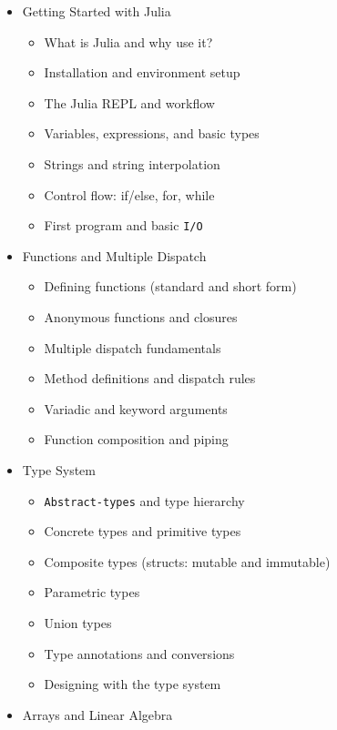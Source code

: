 \documentclass[
]{article}
\providecommand{\tightlist}{%
  \setlength{\itemsep}{0pt}\setlength{\parskip}{0pt}}
\begin{document}
\begin{itemize}
\tightlist
\item
  Getting Started with Julia

  \begin{itemize}
  \tightlist
  \item
    What is Julia and why use it?
  \item
    Installation and environment setup
  \item
    The Julia REPL and workflow
  \item
    Variables, expressions, and basic types
  \item
    Strings and string interpolation
  \item
    Control flow: if/else, for, while
  \item
    First program and basic \texttt{I/O}
  \end{itemize}
\item
  Functions and Multiple Dispatch

  \begin{itemize}
  \tightlist
  \item
    Defining functions (standard and short form)
  \item
    Anonymous functions and closures
  \item
    Multiple dispatch fundamentals
  \item
    Method definitions and dispatch rules
  \item
    Variadic and keyword arguments
  \item
    Function composition and piping
  \end{itemize}
\item
  Type System

  \begin{itemize}
  \tightlist
  \item
    \texttt{Abstract-types} and type hierarchy
  \item
    Concrete types and primitive types
  \item
    Composite types (structs: mutable and immutable)
  \item
    Parametric types
  \item
    Union types
  \item
    Type annotations and conversions
  \item
    Designing with the type system
  \end{itemize}
\item
  Arrays and Linear Algebra


\end{itemize}
\end{document}
